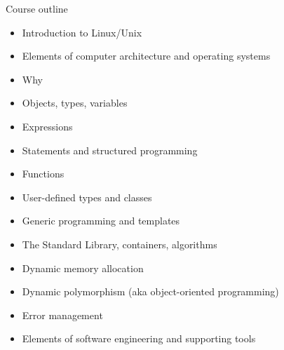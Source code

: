 \begin{frame}{Course outline}
  \begin{itemize}
  \item<1-> Introduction to Linux/Unix
  \item<2-> Elements of computer architecture and operating systems
  \item<3-> Why \Cpp{}
  \item<4-> Objects, types, variables
  \item<4-> Expressions
  \item<4-> Statements and structured programming
  \item<4-> Functions
  \item<4-> User-defined types and classes
  \item<4-> Generic programming and templates
  \item<4-> The Standard Library, containers, algorithms
  \item<4-> Dynamic memory allocation
  \item<4-> Dynamic polymorphism (aka object-oriented programming)
  \item<4-> Error management
  \item<5-> Elements of software engineering and supporting tools
  \end{itemize}
\end{frame}

